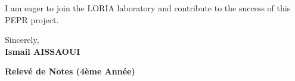 \documentclass[a4paper,11pt]{article}
\begin{document}
I am eager to join the LORIA laboratory and contribute to the success of this PEPR project.

\bigskip
Sincerely, \\
\textbf{Ismail AISSAOUI}

\newpage

\begin{center}
    {\Huge\bfseries Relevé de Notes (4ème Année)}\\[20pt]
\end{center}


\end{document}
